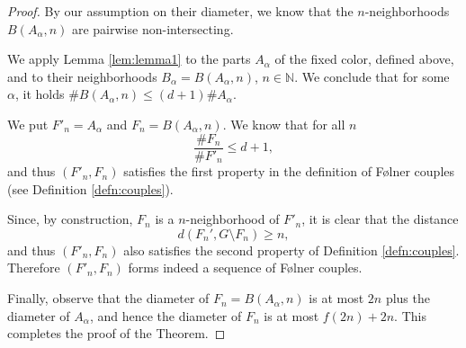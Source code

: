 \documentclass[10pt,a4paper]{amsart}
\begin{document}
\begin{proof}
By our assumption on their diameter, we know that the 
   $n$-neighborhoods  $B(A_{\alpha}, n)$ are pairwise non-intersecting.

We apply Lemma \ref{lem:lemma1} to the parts  $A_{\alpha}$ of the fixed color, defined
above,
and to their neighborhoods  $B_{\alpha}=B(A_{\alpha}, n)$, $n \in \mathbb{N}$.
We conclude that for some $\alpha$, it holds $\#B(A_{\alpha},n) \leqslant (d+1)\#A_\alpha$.


We  put $F'_n = A_{\alpha}$ and $F_n = B(A_\alpha, n)$.
We know that for all $n$
$$
\frac{\# F_n}{\# F'_{n}} \le d+1,
$$
and thus $(F'_n, F_n)$ satisfies the first property in the definition of F{\o}lner couples (see Definition \ref{defn:couples}).

Since, by construction, $F_n$ is a $n$-neighborhood of $F'_n$, it is clear that the distance 
$$
 d (F_n', G \setminus F_n) \ge n,
$$
and thus $(F'_n, F_n)$ also satisfies the second property of Definition \ref{defn:couples}. Therefore  $(F'_n, F_n)$ forms indeed a sequence  of F{\o}lner couples.

Finally, observe that the diameter of $F_n = B(A_\alpha, n)$ is at most $2n$ plus
the diameter of $A_{\alpha}$, and hence the diameter of $F_n$ is at most
$f(2n)+2n$. This completes the proof of the Theorem.
 
\end{proof}
\end{document}

